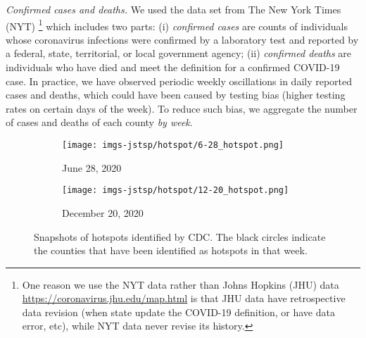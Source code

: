 \documentclass[journal]{IEEEtran}
\begin{document}
\vspace{.05in}
\noindent\emph{Confirmed cases and deaths.}
We used the data set from The New York Times (NYT) \cite{NYT2019}\footnote{One reason we use the NYT data rather than Johns Hopkins (JHU) data \url{https://coronavirus.jhu.edu/map.html} is that JHU data have retrospective data revision (when state update the COVID-19 definition, or have data error, etc), while NYT data never revise its history.} which
includes two parts: (i) \emph{confirmed cases} are counts of individuals whose coronavirus infections were confirmed by a laboratory test and reported by a federal, state, territorial, or local government agency;
(ii) \emph{confirmed deaths} are individuals who have died and meet the definition for a confirmed COVID-19 case. 
In practice, we have observed periodic weekly oscillations in daily reported cases and deaths, which could have been caused by testing bias (higher testing rates on certain days of the week). To reduce such bias, 
we aggregate the number of cases and deaths of each county {\it by week}. 

\begin{figure}[!t]
\centering
\begin{subfigure}[h]{0.49\linewidth}
\texttt{[image: imgs-jstsp/hotspot/6-28\_hotspot.png]}
\caption{June 28, 2020}
\end{subfigure}
\begin{subfigure}[h]{0.49\linewidth}
\texttt{[image: imgs-jstsp/hotspot/12-20\_hotspot.png]}
\caption{December 20, 2020}
\end{subfigure}
\caption{Snapshots of hotspots identified by CDC. The black circles indicate the counties that have been identified as hotspots in that week.}
\label{fig:data-hotspot}
\end{figure}
\end{document}

